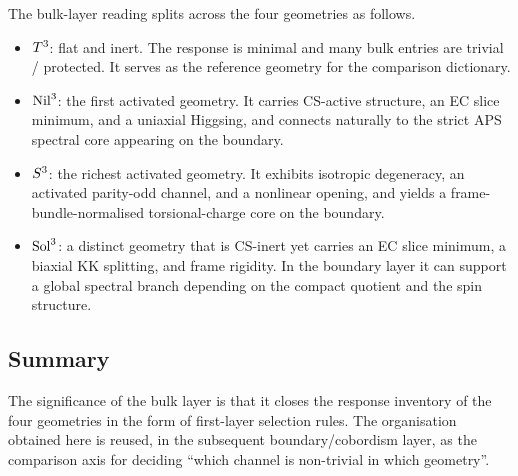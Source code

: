 The bulk-layer reading splits across the four geometries as follows.

\begin{itemize}
  \item $T^3$: flat and inert.  The response is minimal and many bulk
        entries are trivial / protected.  It serves as the reference geometry
        for the comparison dictionary.
  \item $\mathrm{Nil}^3$: the first activated geometry.  It carries CS-active
        structure, an EC slice minimum, and a uniaxial Higgsing, and connects
        naturally to the strict APS spectral core appearing on the boundary.
  \item $S^3$: the richest activated geometry.  It exhibits isotropic
        degeneracy, an activated parity-odd channel, and a nonlinear opening,
        and yields a frame-bundle-normalised torsional-charge core on the
        boundary.
  \item $\mathrm{Sol}^3$: a distinct geometry that is CS-inert yet carries an EC
        slice minimum, a biaxial KK splitting, and frame rigidity.  In the
        boundary layer it can support a global spectral branch depending on
        the compact quotient and the spin structure.
\end{itemize}

\subsection{Summary}
\label{sec:bulk:summary}

The significance of the bulk layer is that it closes the response inventory
of the four geometries in the form of first-layer selection rules.  The
organisation obtained here is reused, in the subsequent boundary/cobordism
layer, as the comparison axis for deciding ``which channel is non-trivial in
which geometry''.
